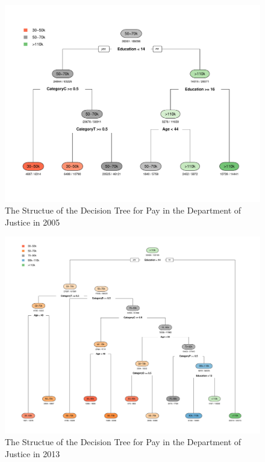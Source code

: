 \documentclass{article}
\begin{document}
    \begin{center}
        \begin{figure}
            \includegraphics[scale=0.4]{./images/pay-decision-tree-2005.pdf}
            \caption{The Structue of the Decision Tree for Pay in the Department of Justice in 2005}
            \label{paydesctree2005}
        \end{figure}
    \end{center}

    \begin{center}
        \begin{figure}
            \includegraphics[scale=0.4]{./images/pay-decision-tree-2013.pdf}
            \caption{The Structue of the Decision Tree for Pay in the Department of Justice in 2013}
            \label{paydesctree2013}
        \end{figure}
    \end{center}
\end{document}
